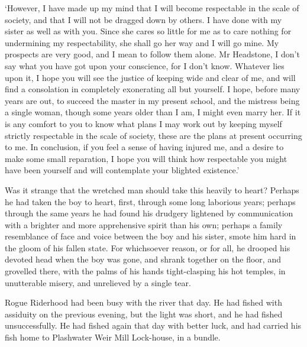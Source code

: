‘However, I have made up my mind that I will become respectable in the
scale of society, and that I will not be dragged down by others. I have
done with my sister as well as with you. Since she cares so little for
me as to care nothing for undermining my respectability, she shall go
her way and I will go mine. My prospects are very good, and I mean to
follow them alone. Mr Headstone, I don’t say what you have got upon your
conscience, for I don’t know. Whatever lies upon it, I hope you will see
the justice of keeping wide and clear of me, and will find a consolation
in completely exonerating all but yourself. I hope, before many years
are out, to succeed the master in my present school, and the mistress
being a single woman, though some years older than I am, I might even
marry her. If it is any comfort to you to know what plans I may work out
by keeping myself strictly respectable in the scale of society, these
are the plans at present occurring to me. In conclusion, if you feel a
sense of having injured me, and a desire to make some small reparation,
I hope you will think how respectable you might have been yourself and
will contemplate your blighted existence.’

Was it strange that the wretched man should take this heavily to
heart? Perhaps he had taken the boy to heart, first, through some
long laborious years; perhaps through the same years he had found
his drudgery lightened by communication with a brighter and more
apprehensive spirit than his own; perhaps a family resemblance of face
and voice between the boy and his sister, smote him hard in the gloom
of his fallen state. For whichsoever reason, or for all, he drooped his
devoted head when the boy was gone, and shrank together on the floor,
and grovelled there, with the palms of his hands tight-clasping his hot
temples, in unutterable misery, and unrelieved by a single tear.


Rogue Riderhood had been busy with the river that day. He had fished
with assiduity on the previous evening, but the light was short, and
he had fished unsuccessfully. He had fished again that day with better
luck, and had carried his fish home to Plashwater Weir Mill Lock-house,
in a bundle.



